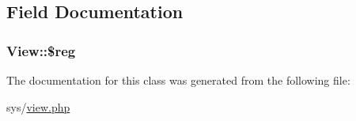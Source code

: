 \subsection{Field Documentation}
\hypertarget{classView_a56051420e93ae7d0769a1f4a5d90fba6}{}
\subsubsection[{\$reg}]{\setlength{\rightskip}{0pt plus 5cm}View\+::\$reg\hspace{0.3cm}{\ttfamily [protected]}}\label{classView_a56051420e93ae7d0769a1f4a5d90fba6}


The documentation for this class was generated from the following file\+:\begin{DoxyCompactItemize}
\item 
sys/\hyperlink{view_8php}{view.\+php}\end{DoxyCompactItemize}
